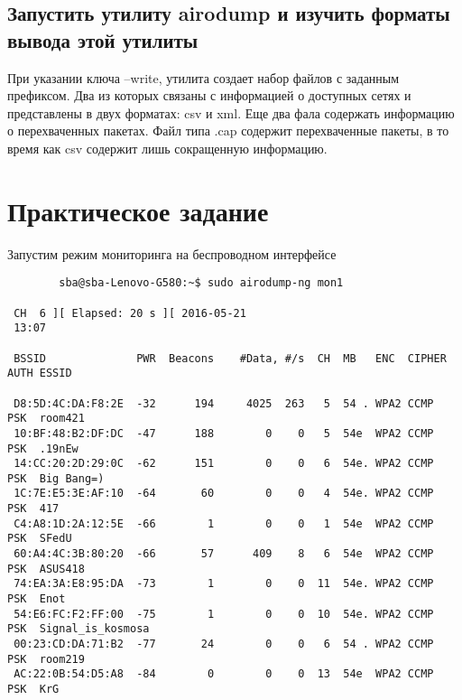 \documentclass[10pt,a4paper]{report}
\begin{document}
		\subsection{Запустить утилиту airodump и изучить форматы вывода этой утилиты}
			При указании ключа –write, утилита создает набор файлов с заданным префиксом. Два из которых связаны с информацией о доступных сетях и представлены в двух форматах: csv и xml. Еще два фала содержать информацию о перехваченных пакетах. Файл типа .cap содержит перехваченные пакеты, в то время как csv содержит лишь сокращенную информацию.
	\section{Практическое задание}
		Запустим режим мониторинга на беспроводном интерфейсе
		\begin{lstlisting}
		sba@sba-Lenovo-G580:~$ sudo airodump-ng mon1

 CH  6 ][ Elapsed: 20 s ][ 2016-05-21 
 13:07                                                                          
   
 BSSID              PWR  Beacons    #Data, #/s  CH  MB   ENC  CIPHER AUTH ESSID
                                    
 D8:5D:4C:DA:F8:2E  -32      194     4025  263   5  54 . WPA2 CCMP   PSK  room421                                                    
 10:BF:48:B2:DF:DC  -47      188        0    0   5  54e  WPA2 CCMP   PSK  .19nEw                                                     
 14:CC:20:2D:29:0C  -62      151        0    0   6  54e. WPA2 CCMP   PSK  Big Bang=)                                                 
 1C:7E:E5:3E:AF:10  -64       60        0    0   4  54e. WPA2 CCMP   PSK  417                                                        
 C4:A8:1D:2A:12:5E  -66        1        0    0   1  54e  WPA2 CCMP   PSK  SFedU                                                      
 60:A4:4C:3B:80:20  -66       57      409    8   6  54e  WPA2 CCMP   PSK  ASUS418                                                     
 74:EA:3A:E8:95:DA  -73        1        0    0  11  54e. WPA2 CCMP   PSK  Enot                                                        
 54:E6:FC:F2:FF:00  -75        1        0    0  10  54e. WPA2 CCMP   PSK  Signal_is_kosmosa                                           
 00:23:CD:DA:71:B2  -77       24        0    0   6  54 . WPA2 CCMP   PSK  room219                                                     
 AC:22:0B:54:D5:A8  -84        0        0    0  13  54e  WPA2 CCMP   PSK  KrG                                                         
                                               

\end{lstlisting}
\end{document}

